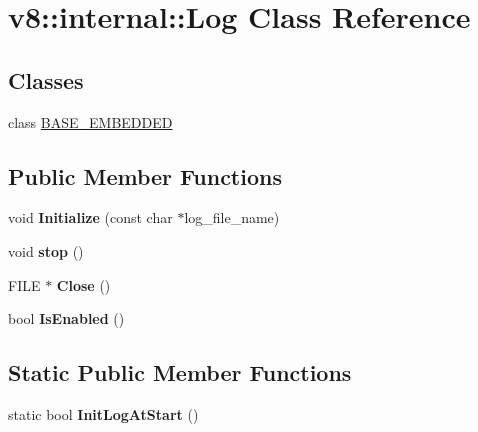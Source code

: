 \hypertarget{classv8_1_1internal_1_1_log}{}\section{v8\+:\+:internal\+:\+:Log Class Reference}
\label{classv8_1_1internal_1_1_log}
\subsection*{Classes}
\begin{DoxyCompactItemize}
\item 
class \hyperlink{classv8_1_1internal_1_1_log_1_1_b_a_s_e___e_m_b_e_d_d_e_d}{B\+A\+S\+E\+\_\+\+E\+M\+B\+E\+D\+D\+ED}
\end{DoxyCompactItemize}
\subsection*{Public Member Functions}
\begin{DoxyCompactItemize}
\item 
void {\bfseries Initialize} (const char $\ast$log\+\_\+file\+\_\+name)\hypertarget{classv8_1_1internal_1_1_log_a3df01da984f2e9b9234c88578247dd69}{}\label{classv8_1_1internal_1_1_log_a3df01da984f2e9b9234c88578247dd69}

\item 
void {\bfseries stop} ()\hypertarget{classv8_1_1internal_1_1_log_a495b1e6c4a7b2b77772319711e5006b0}{}\label{classv8_1_1internal_1_1_log_a495b1e6c4a7b2b77772319711e5006b0}

\item 
F\+I\+LE $\ast$ {\bfseries Close} ()\hypertarget{classv8_1_1internal_1_1_log_a696f45100002e8105c4d70e8cb5a9cab}{}\label{classv8_1_1internal_1_1_log_a696f45100002e8105c4d70e8cb5a9cab}

\item 
bool {\bfseries Is\+Enabled} ()\hypertarget{classv8_1_1internal_1_1_log_a0208fed7368c378edca31079e71bb668}{}\label{classv8_1_1internal_1_1_log_a0208fed7368c378edca31079e71bb668}

\end{DoxyCompactItemize}
\subsection*{Static Public Member Functions}
\begin{DoxyCompactItemize}
\item 
static bool {\bfseries Init\+Log\+At\+Start} ()\hypertarget{classv8_1_1internal_1_1_log_a7dac4222ea501bc24435d3b3b3eddf9b}{}\label{classv8_1_1internal_1_1_log_a7dac4222ea501bc24435d3b3b3eddf9b}

\end{DoxyCompactItemize}
